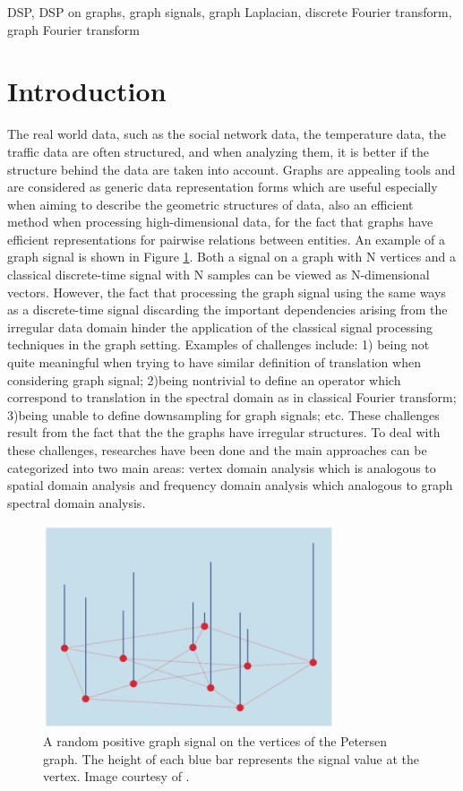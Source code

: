 \documentclass[conference]{IEEEtran}
\begin{document}
\begin{IEEEkeywords}
DSP, DSP on graphs, graph signals, graph Laplacian, discrete Fourier transform, graph Fourier transform
\end{IEEEkeywords}

\section{Introduction}
The real world data, such as the social network data, the temperature data, the traffic data are often structured, and when analyzing them, it is better if the structure behind the data are taken into account. Graphs are appealing tools and are considered as generic data representation forms which are useful especially when aiming to describe the geometric structures of data, also an efficient method when processing high-dimensional data, for the fact that graphs have efficient representations for pairwise relations between entities. An example of a graph signal is shown in Figure \ref{1}. Both a signal on a graph with N vertices and a classical discrete-time signal with N samples can be viewed as N-dimensional vectors\cite{shuman2013emerging}. However, the fact that processing the graph signal using the same ways as a discrete-time signal discarding the important dependencies arising from the irregular data domain hinder the application of the classical signal processing techniques in the graph setting. Examples of challenges include: 1) being not quite meaningful when trying to have similar definition of translation when considering graph signal; 2)being nontrivial to define an operator which correspond to translation in the spectral domain as in classical Fourier transform; 3)being unable to define downsampling for graph signals; etc. These challenges result from the fact that the the graphs have irregular structures. To deal with these challenges, researches have been done and the main approaches can be categorized into two main areas: vertex domain analysis which is analogous to spatial domain analysis and frequency domain analysis which analogous to graph spectral domain analysis. 
\begin{figure}[!htbp]
\centerline{\includegraphics[width=3.4in]{1.png}}
\caption{A random positive graph signal on the vertices of the Petersen graph. The height of each blue bar represents the signal value at the vertex. Image courtesy of \cite{shuman2013emerging}.}
\label{1}
\end{figure}
\end{document}
